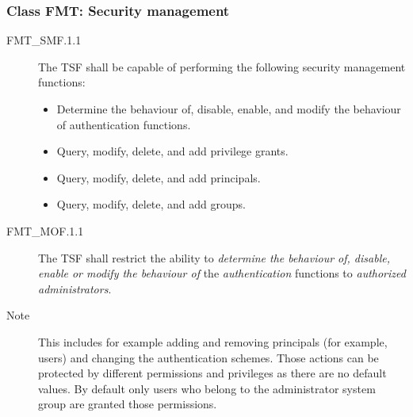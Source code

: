 \documentclass[12pt,english]{scrbook}
\begin{document}



\subsubsection{Class FMT: Security management}



\begin{description}

\item[FMT{\_}SMF.1.1]

The TSF shall be capable of performing the following security management
functions:

\begin{itemize}
    \item Determine the behaviour of, disable, enable, and modify the
behaviour of authentication functions.
    \item Query, modify, delete, and add privilege grants.
    \item Query, modify, delete, and add principals.
    \item Query, modify, delete, and add groups.
\end{itemize}

\end{description}




\begin{description}

\item[FMT{\_}MOF.1.1]

The TSF shall restrict the ability to \emph{determine the
behaviour of, disable, enable or modify the behaviour of} the
\emph{authentication} functions to \emph{authorized administrators}.

\item[Note]
This includes for example adding and removing principals (for example,
users) and changing the authentication schemes. Those actions can be
protected by different permissions and privileges as there are no default
values. By default only users who belong to the administrator system group are
granted those permissions.

\end{description}
\end{document}
